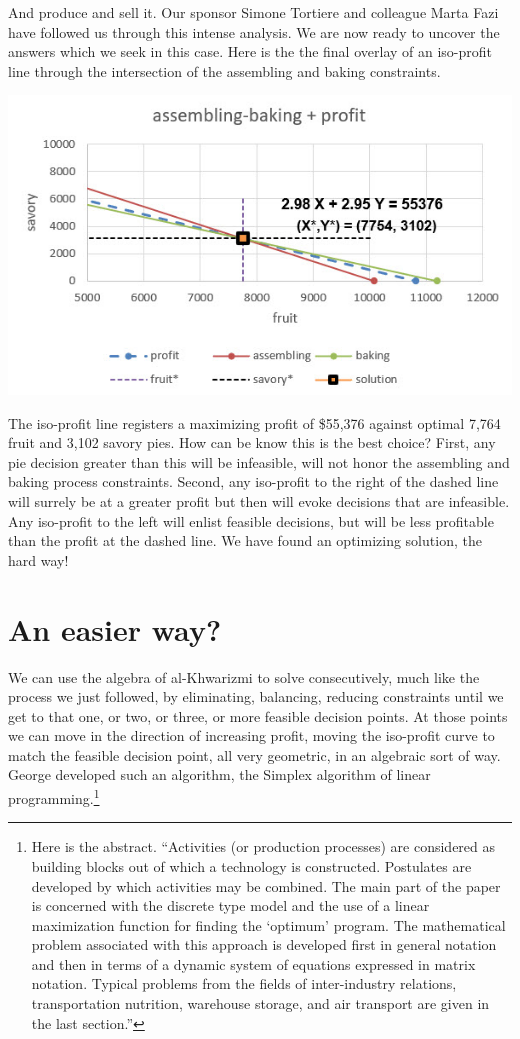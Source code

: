 \documentclass[
]{book}
\begin{document}
And produce and sell it. Our sponsor Simone Tortiere and colleague Marta Fazi have followed us through this intense analysis. We are now ready to uncover the answers which we seek in this case. Here is the the final overlay of an iso-profit line through the intersection of the assembling and baking constraints.

\includegraphics{images/03/pie-2-product-solution.jpg}

The iso-profit line registers a maximizing profit of \$55,376 against optimal 7,764 fruit and 3,102 savory pies. How can be know this is the best choice? First, any pie decision greater than this will be infeasible, will not honor the assembling and baking process constraints. Second, any iso-profit to the right of the dashed line will surrely be at a greater profit but then will evoke decisions that are infeasible. Any iso-profit to the left will enlist feasible decisions, but will be less profitable than the profit at the dashed line. We have found an optimizing solution, the hard way!

\hypertarget{an-easier-way}{%
\section{An easier way?}\label{an-easier-way}}

We can use the algebra of al-Khwarizmi to solve consecutively, much like the process we just followed, by eliminating, balancing, reducing constraints until we get to that one, or two, or three, or more feasible decision points. At those points we can move in the direction of increasing profit, moving the iso-profit curve to match the feasible decision point, all very geometric, in an algebraic sort of way. George \citet{Dantzig1949b} developed such an algorithm, the Simplex algorithm of linear programming.\footnote{Here is the abstract. ``Activities (or production processes) are considered as building blocks out of which a technology is constructed. Postulates are developed by which activities may be combined. The main part of the paper is concerned with the discrete type model and the use of a linear maximization function for finding the `optimum' program. The mathematical problem associated with this approach is developed first in general notation and then in terms of a dynamic system of equations expressed in matrix notation. Typical problems from the fields of inter-industry relations, transportation nutrition, warehouse storage, and air transport are given in the last section.''}
\end{document}
